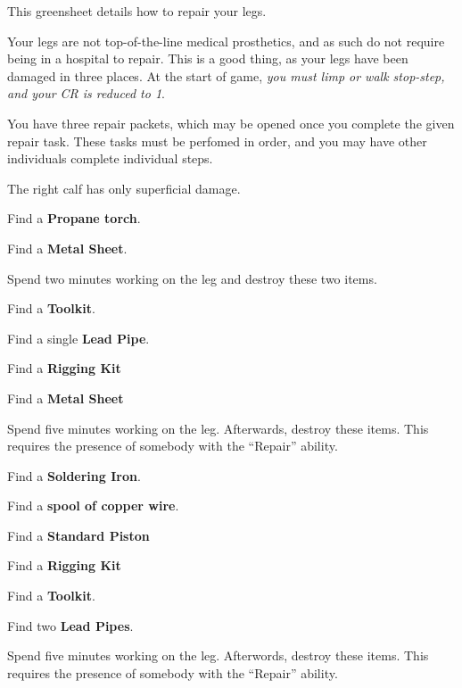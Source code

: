 \documentclass[green]{airship}
\begin{document}
\name{\gCowboyRepair{}}

This greensheet details how to repair your legs.  

Your legs are not top-of-the-line medical prosthetics, and as such do not require being in a hospital to repair.  This is a good thing, as your legs have been damaged in three places.  At the start of game, {\em you must limp or walk stop-step, and your CR is reduced to 1}.

You have three repair packets, which may be opened once you complete the given repair task.  These tasks must be perfomed in order, and you may have other individuals complete individual steps.

The right calf has only superficial damage.

\begin{enum}
  \item Find a {\bf Propane torch}.
  \item Find a {\bf Metal Sheet}.
  \item Spend two minutes working on the leg and destroy these two items.
\end{enum}

\begin{enum}
  \item Find a {\bf Toolkit}.
  \item Find a single {\bf Lead Pipe}.
  \item Find a {\bf Rigging Kit}
  \item Find a {\bf Metal Sheet}
  \item Spend five minutes working on the leg.  Afterwards, destroy these items. This requires the presence of somebody with the ``Repair'' ability.
\end{enum}

\begin{enum}
  \item Find a {\bf Soldering Iron}.
  \item Find a {\bf spool of copper wire}.
  \item Find a {\bf Standard Piston}
  \item Find a {\bf Rigging Kit}
  \item Find a {\bf Toolkit}.
  \item Find two {\bf Lead Pipes}.
  \item Spend five minutes working on the leg.  Afterwords, destroy these items. This requires the presence of somebody with the ``Repair'' ability.
\end{enum}
\end{document}
